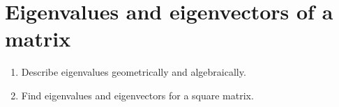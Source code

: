 \section{Eigenvalues and eigenvectors of a matrix}

\begin{outcome}
  \begin{enumerate}
  \item Describe eigenvalues geometrically and algebraically.
  \item Find eigenvalues and eigenvectors for a square matrix.
  \end{enumerate}
\end{outcome}

